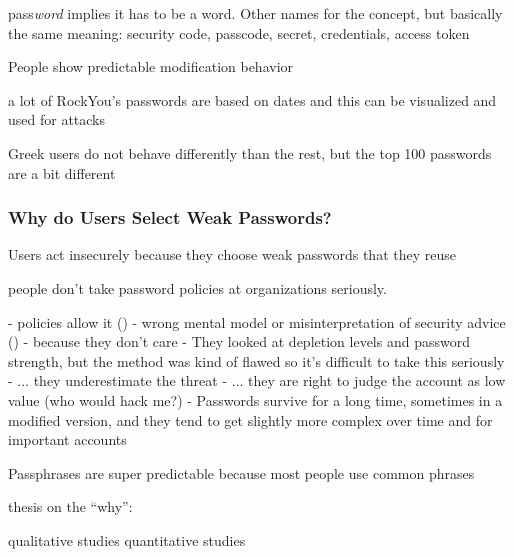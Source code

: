 	pass\textit{word} implies it has to be a word. Other names for the concept, but basically the same meaning: security code, passcode, secret, credentials, access token
	
	\cite{Jakobsson2013BenefitsUnderstandingPWs}
	
	People show predictable modification behavior \cite{Gaw2005ReuseRecycle}
	
	
	a lot of RockYou's passwords are based on dates and this can be visualized and used for attacks \cite{Veras2012VisualizingSemanticsPasswords}
	
	Greek users do not behave differently than the rest, but the top 100 passwords are a bit different \cite{Violettas2014PasswordsAvoidGreece}
	
	
	\cite{Li2017PersonalInformation}

	\subsubsection{Why do Users Select Weak Passwords?}
	
	Users act insecurely because they choose weak passwords that they reuse \cite{Riley2006WhatUsersKnowWhatTheyDo}
	
	people don't take password policies at organizations seriously.  \cite{Weirich2005PersuasivePasswordSecurity}
	
	- policies allow it (\cite{Seitz2017PoliciesReuse})
	- wrong mental model or misinterpretation of security advice (\cite{Ur2015PWCreationLab, Ur2016PerceptionsPassword, Seitz2017PASDJO})
	- because they don't care
	- They looked at depletion levels and password strength, but the method was kind of flawed so it's difficult to take this seriously \cite{Gross2016EffectCognitiveEffort}
	- ... they underestimate the threat
	- ... they are right to judge the account as low value (who would hack me?) \cite{LastPass2016PersonalitiesGetUsHacked}
	- Passwords survive for a long time, sometimes in a modified version, and they tend to get slightly more complex over time and for important accounts\cite{VonZezschwitz2013SurvivalShortest}
	
	Passphrases are super predictable because most people use common phrases \cite{Bonneau2012LinguisticProperties}
	
	\cite{Wang2015ChinesePWs}
	
	thesis on the ``why'': \cite{Notoatmodjo2007ExploringWeakestLink}
	
	qualitative studies \cite{Ur2015PWCreationLab, Stobert2014PasswordLifeCycle} 
	quantitative studies \cite{Ur2016PerceptionsPassword, Seitz2017PASDJO}
	
